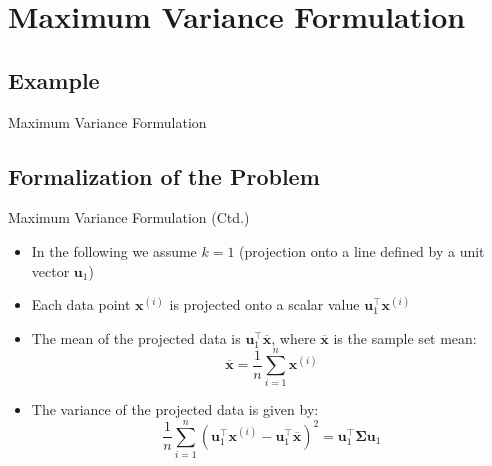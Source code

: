 \section{Maximum Variance Formulation}

\subsection{Example}

\begin{frame}{Maximum Variance Formulation}{}
	
\end{frame}


\subsection{Formalization of the Problem}

\begin{frame}{Maximum Variance Formulation (Ctd.)}{}
	\begin{itemize}
		\item In the following we assume $k = 1$ {\footnotesize (projection onto a line defined by a unit vector $\bm{u}_1$)}
		\item Each data point $\bm{x}^{(i)}$ is projected onto a scalar value $\bm{u}_1^{\intercal} \bm{x}^{(i)}$
		\item The mean of the projected data is $\bm{u}_1^{\intercal} \overline{\bm{x}}$, where $\overline{\bm{x}}$
			is the sample set mean:
		\begin{equation}
			\overline{\bm{x}} = \frac{1}{n} \sum_{i=1}^n \bm{x}^{(i)}
		\end{equation}
		\item The variance of the projected data is given by:
		\begin{equation}
			\frac{1}{n} \sum_{i=1}^n \left( \bm{u}_1^{\intercal} \bm{x}^{(i)} -
				\bm{u}_1^{\intercal} \overline{\bm{x}} \right)^2 = \bm{u}_1^{\intercal} \bm{\Sigma} \bm{u}_1
		\end{equation}
	\end{itemize}
\end{frame}



